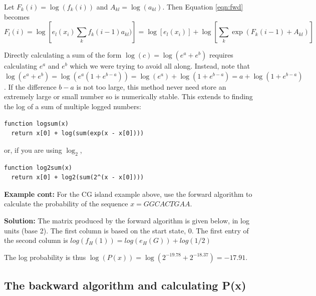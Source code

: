 \documentclass[11pt]{article}
\begin{document}
Let $F_k(i) = \log(f_k(i))$ and  $A_{kl} = \log(a_{kl})$.  Then Equation  \ref{eqn:fwd} becomes 
\[ F_l(i) = \log [ e_l(x_i) \sum_k  f_k(i-1)a_{kl})]  = \log [ e_l(x_i)] +  \log \left[\sum_k  \exp(F_k(i-1) + A_{kl})\right] \]

Directly calculating a sum of the form $\log(c) = \log(e^a + e^b) $ requires calculating $e^a$ and $e^b$ which we were trying to avoid all along.  Instead, note that $\log(e^a + e^b) = \log(e^a(1 + e^{b-a}) ) = \log(e^a) + \log(1 + e^{b-a}) = a + \log(1 + e^{b-a})$.  If the difference $b-a$ is not too large, this method never need store an extremely large or small number so is numerically stable.  This extends to finding the log of a sum of multiple logged numbers:
\begin{verbatim}
function logsum(x)
  return x[0] + log(sum(exp(x - x[0])))
\end{verbatim}
or, if you are using $\log_2$,
\begin{verbatim}
function log2sum(x)
  return x[0] + log2(sum(2^(x - x[0])))
\end{verbatim}

{\bf Example cont:} For the CG island example above,  use the forward algorithm to calculate the probability of the   sequence $x = GGCACTGAA$.

{\bf Solution:} The matrix produced by the forward algorithm is given below, in log units (base 2).  The first column is based on the start state, 0.  The first entry of the second  column is $log(f_H(1)) = log(e_H(G))  + log(1/2)$


The log probability is thus $\log(P(x)) = \log(2^{-19.78} + 2^{-18.37}) = -17.91$.
 

 
\subsection{The backward algorithm and calculating P(x)}
\end{document}
